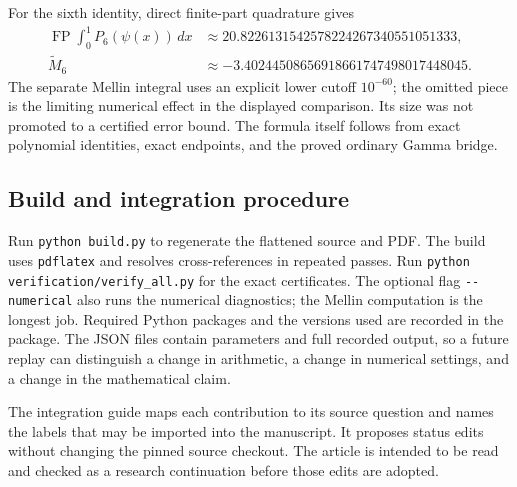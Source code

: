 \documentclass[11pt,a4paper]{article}
\numberwithin{equation}{section}
\theoremstyle{plain}
\theoremstyle{definition}
\theoremstyle{remark}
\DeclareMathOperator{\FP}{FP}
\newcommand{\src}[1]{\nolinkurl{#1}}
\begin{document}
For the sixth identity, direct finite-part quadrature gives
\begin{align*}
 \FP\int_0^1P_6(\psi(x))\,dx
  &\approx20.8226131542578224267340551051333,\\
 \widetilde M_6
  &\approx-3.40244508656918661747498017448045.
\end{align*}
The separate Mellin integral uses an explicit lower cutoff $10^{-60}$;
the omitted piece is the limiting numerical effect in the displayed
comparison. Its size was not promoted to a certified error bound. The
formula itself follows from exact polynomial identities, exact endpoints,
and the proved ordinary Gamma bridge.

\subsection{Build and integration procedure}

Run \src{python build.py} to regenerate the flattened source and PDF.
The build uses \src{pdflatex} and resolves cross-references in repeated
passes. Run \src{python verification/verify_all.py} for the exact
certificates. The optional flag \src{--numerical} also runs the numerical
diagnostics; the Mellin computation is the longest job.
Required Python packages and the versions used are recorded in the
package. The JSON files contain parameters and full recorded output,
so a future replay can distinguish a change in arithmetic, a change in
numerical settings, and a change in the mathematical claim.

The integration guide maps each contribution to its source question and
names the labels that may be imported into the manuscript. It proposes
status edits without changing the pinned source checkout. The article is
intended to be read and checked as a research continuation before those
edits are adopted.

\end{document}
